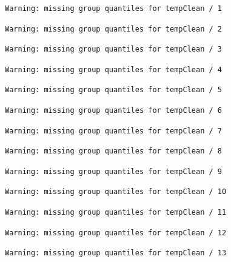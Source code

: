 \documentclass[
]{article}
\begin{document}
\begin{verbatim}
Warning: missing group quantiles for tempClean / 1
\end{verbatim}

\begin{verbatim}
Warning: missing group quantiles for tempClean / 2
\end{verbatim}

\begin{verbatim}
Warning: missing group quantiles for tempClean / 3
\end{verbatim}

\begin{verbatim}
Warning: missing group quantiles for tempClean / 4
\end{verbatim}

\begin{verbatim}
Warning: missing group quantiles for tempClean / 5
\end{verbatim}

\begin{verbatim}
Warning: missing group quantiles for tempClean / 6
\end{verbatim}

\begin{verbatim}
Warning: missing group quantiles for tempClean / 7
\end{verbatim}

\begin{verbatim}
Warning: missing group quantiles for tempClean / 8
\end{verbatim}

\begin{verbatim}
Warning: missing group quantiles for tempClean / 9
\end{verbatim}

\begin{verbatim}
Warning: missing group quantiles for tempClean / 10
\end{verbatim}

\begin{verbatim}
Warning: missing group quantiles for tempClean / 11
\end{verbatim}

\begin{verbatim}
Warning: missing group quantiles for tempClean / 12
\end{verbatim}

\begin{verbatim}
Warning: missing group quantiles for tempClean / 13
\end{verbatim}
\end{document}
